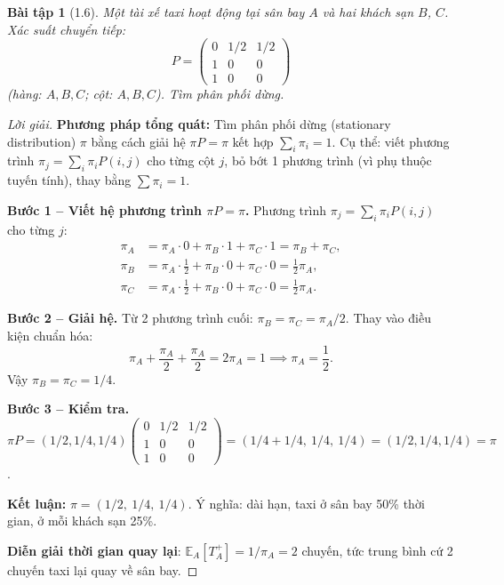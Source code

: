 \documentclass[8pt,a4paper]{article}
\newtheorem{exercise}{Bài tập}
\newenvironment{solution}{\begin{proof}[Lời giải]}{\end{proof}}
\newcommand{\E}{\mathbb{E}}
\begin{document}
\begin{exercise}[1.6]
Một tài xế taxi hoạt động tại sân bay $A$ và hai khách sạn $B$, $C$. Xác suất chuyển tiếp:
\[
  P = \begin{pmatrix} 0 & 1/2 & 1/2 \\ 1 & 0 & 0 \\ 1 & 0 & 0 \end{pmatrix}
\]
(hàng: $A, B, C$; cột: $A, B, C$). Tìm phân phối dừng.
\end{exercise}
\begin{solution}
\textbf{Phương pháp tổng quát:} Tìm phân phối dừng (stationary distribution) $\pi$ bằng cách giải hệ $\pi P = \pi$ kết hợp $\sum_i \pi_i = 1$. Cụ thể: viết phương trình $\pi_j = \sum_i \pi_i P(i,j)$ cho từng cột $j$, bỏ bớt 1 phương trình (vì phụ thuộc tuyến tính), thay bằng $\sum \pi_i = 1$.

\textbf{Bước 1 -- Viết hệ phương trình $\pi P = \pi$.}
Phương trình $\pi_j = \sum_i \pi_i P(i,j)$ cho từng $j$:
\begin{align*}
  \pi_A &= \pi_A \cdot 0 + \pi_B \cdot 1 + \pi_C \cdot 1 = \pi_B + \pi_C, \\
  \pi_B &= \pi_A \cdot \tfrac{1}{2} + \pi_B \cdot 0 + \pi_C \cdot 0 = \tfrac{1}{2}\pi_A, \\
  \pi_C &= \pi_A \cdot \tfrac{1}{2} + \pi_B \cdot 0 + \pi_C \cdot 0 = \tfrac{1}{2}\pi_A.
\end{align*}

\textbf{Bước 2 -- Giải hệ.}
Từ 2 phương trình cuối: $\pi_B = \pi_C = \pi_A/2$. Thay vào điều kiện chuẩn hóa:
\[
  \pi_A + \frac{\pi_A}{2} + \frac{\pi_A}{2} = 2\pi_A = 1 \implies \pi_A = \frac{1}{2}.
\]
Vậy $\pi_B = \pi_C = 1/4$.

\textbf{Bước 3 -- Kiểm tra.}
$\pi P = (1/2, 1/4, 1/4) \begin{pmatrix} 0 & 1/2 & 1/2 \\ 1 & 0 & 0 \\ 1 & 0 & 0 \end{pmatrix} = (1/4+1/4,\ 1/4,\ 1/4) = (1/2, 1/4, 1/4) = \pi$. \checkmark

\textbf{Kết luận:} $\pi = (1/2,\ 1/4,\ 1/4)$. Ý nghĩa: dài hạn, taxi ở sân bay 50\% thời gian, ở mỗi khách sạn 25\%.

\textbf{Diễn giải thời gian quay lại}: $\E_A[T_A^+] = 1/\pi_A = 2$ chuyến, tức trung bình cứ 2 chuyến taxi lại quay về sân bay.
\end{solution}
\end{document}

